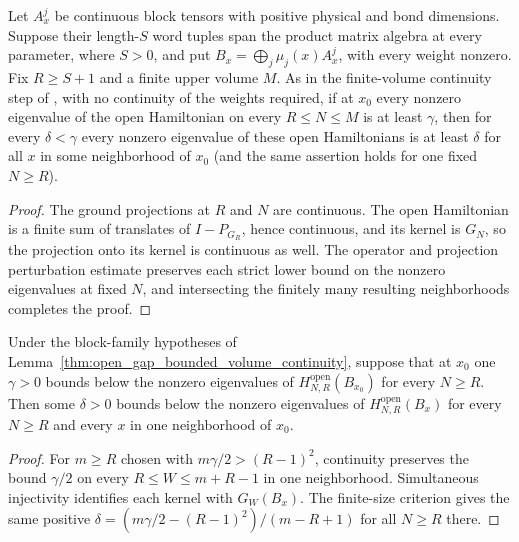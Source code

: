 \begin{lemma}
    \label{thm:open_gap_bounded_volume_continuity}
    \leanok
    Let $A_x^j$ be continuous block tensors with positive physical and bond
    dimensions. Suppose their length-$S$ word tuples span the product matrix
    algebra at every parameter, where $S>0$, and put
    $B_x=\bigoplus_j\mu_j(x)A_x^j$, with every weight nonzero.
    Fix $R\geq S+1$ and a finite upper volume $M$.
    As in the finite-volume continuity step of
    \cite[Appendix~A, lines~2575--2578]{Schuch2011Phases}, with no continuity
    of the weights required, if at $x_0$ every nonzero eigenvalue of the
    open Hamiltonian on every $R\leq N\leq M$ is at least $\gamma$, then
    for every $\delta<\gamma$ every nonzero eigenvalue of these open
    Hamiltonians is at least $\delta$ for all $x$ in some neighborhood of
    $x_0$ (and the same assertion holds for one fixed $N\geq R$).
\end{lemma}
\begin{proof}\leanok
    The ground projections at $R$ and $N$ are continuous. The open
    Hamiltonian is a finite sum of translates of $I-P_{G_R}$, hence
    continuous, and its kernel is $G_N$, so the projection onto its kernel
    is continuous as well. The operator and projection perturbation estimate
    preserves each strict lower bound on the nonzero eigenvalues at fixed
    $N$, and intersecting the finitely many resulting neighborhoods
    completes the proof.
\end{proof}

\begin{lemma}
    \label{thm:open_gap_all_length_neighborhood}
    \leanok
    Under the block-family hypotheses of
    Lemma~\ref{thm:open_gap_bounded_volume_continuity}, suppose that at
    $x_0$ one $\gamma>0$ bounds below the nonzero eigenvalues of
    $H^{\mathrm{open}}_{N,R}(B_{x_0})$ for every $N\geq R$. Then some
    $\delta>0$ bounds below the nonzero eigenvalues of
    $H^{\mathrm{open}}_{N,R}(B_x)$ for every $N\geq R$ and every $x$ in
    one neighborhood of $x_0$.
\end{lemma}
\begin{proof}\leanok
    For $m\geq R$ chosen with $m\gamma/2>(R-1)^2$, continuity preserves
    the bound $\gamma/2$ on every $R\leq W\leq m+R-1$ in one
    neighborhood. Simultaneous injectivity identifies each kernel with
    $G_W(B_x)$. The finite-size criterion gives the same positive
    $\delta=(m\gamma/2-(R-1)^2)/(m-R+1)$ for all $N\geq R$ there.
\end{proof}

